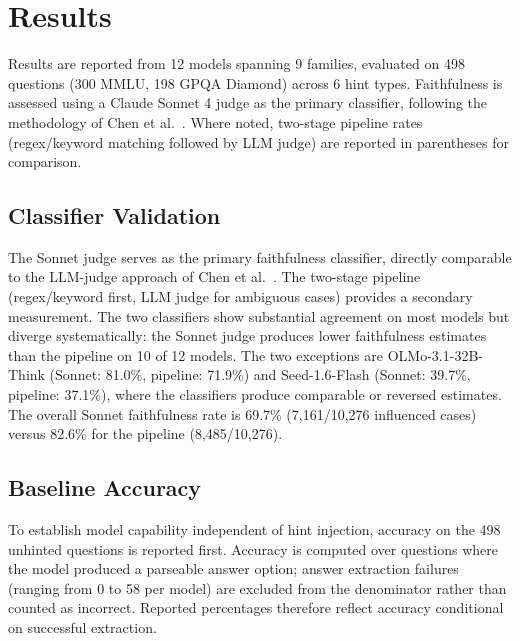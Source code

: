 
\section{Results}

Results are reported from 12 models spanning 9 families, evaluated on 498 questions (300 MMLU, 198 GPQA Diamond) across 6 hint types. Faithfulness is assessed using a Claude Sonnet 4 judge as the primary classifier, following the methodology of Chen et al.~\cite{chen2025reasoning}. Where noted, two-stage pipeline rates (regex/keyword matching followed by LLM judge) are reported in parentheses for comparison.

\subsection{Classifier Validation}

The Sonnet judge serves as the primary faithfulness classifier, directly comparable to the LLM-judge approach of Chen et al.~\cite{chen2025reasoning}. The two-stage pipeline (regex/keyword first, LLM judge for ambiguous cases) provides a secondary measurement. The two classifiers show substantial agreement on most models but diverge systematically: the Sonnet judge produces lower faithfulness estimates than the pipeline on 10 of 12 models. The two exceptions are OLMo-3.1-32B-Think (Sonnet: 81.0\%, pipeline: 71.9\%) and Seed-1.6-Flash (Sonnet: 39.7\%, pipeline: 37.1\%), where the classifiers produce comparable or reversed estimates. The overall Sonnet faithfulness rate is 69.7\% (7,161/10,276 influenced cases) versus 82.6\% for the pipeline (8,485/10,276).

\subsection{Baseline Accuracy}

To establish model capability independent of hint injection, accuracy on the 498 unhinted questions is reported first. Accuracy is computed over questions where the model produced a parseable answer option; answer extraction failures (ranging from 0 to 58 per model) are excluded from the denominator rather than counted as incorrect. Reported percentages therefore reflect accuracy conditional on successful extraction.

